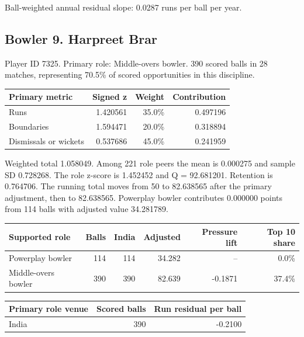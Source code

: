 Ball-weighted annual residual slope: 0.0287 runs per ball per year.

\clearpage

\subsection{Bowler 9. Harpreet Brar}

Player ID 7325. Primary role: Middle-overs bowler. 390 scored balls in 28 matches, representing 70.5\% of scored opportunities in this discipline.

\begin{center}
\begin{tabularx}{\linewidth}{>{\raggedright\arraybackslash}Xrrr}
\toprule
Primary metric & Signed z & Weight & Contribution \\
\midrule
Runs & 1.420561 & 35.0\% & 0.497196 \\
Boundaries & 1.594471 & 20.0\% & 0.318894 \\
Dismissals or wickets & 0.537686 & 45.0\% & 0.241959 \\
\bottomrule
\end{tabularx}
\end{center}

Weighted total 1.058049. Among 221 role peers the mean is 0.000275 and sample SD 0.728268. The role z-score is 1.452452 and Q = 92.681201. Retention is 0.764706. The running total moves from 50 to 82.638565 after the primary adjustment, then to 82.638565. Powerplay bowler contributes 0.000000 points from 114 balls with adjusted value 34.281789.

\begin{center}
\begin{tabularx}{\linewidth}{>{\raggedright\arraybackslash}Xrrrrr}
\toprule
Supported role & Balls & India & Adjusted & Pressure lift & Top 10 share \\
\midrule
Powerplay bowler & 114 & 114 & 34.282 & -- & 0.0\% \\
Middle-overs bowler & 390 & 390 & 82.639 & -0.1871 & 37.4\% \\
\bottomrule
\end{tabularx}
\end{center}

\begin{center}
\begin{tabularx}{\linewidth}{>{\raggedright\arraybackslash}Xrr}
\toprule
Primary role venue & Scored balls & Run residual per ball \\
\midrule
India & 390 & -0.2100 \\
\bottomrule
\end{tabularx}
\end{center}

